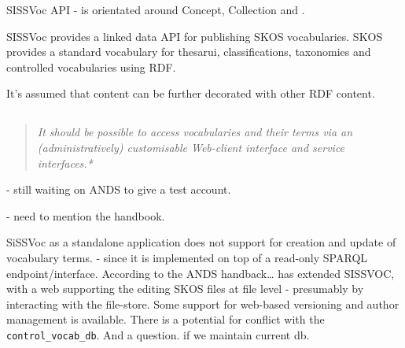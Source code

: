 \documentclass[10pt,a4paper]{article}
\newenvironment{italicquotes}
{\begin{quote}\itshape}
{\end{quote}}
\begin{document}
\begin{flushleft}
  SISSVoc API - is orientated around Concept, Collection and .


  SISSVoc provides a linked data API for publishing SKOS vocabularies.
  SKOS provides a standard vocabulary for thesarui, classifications, taxonomies
  and controlled vocabularies using RDF.

  It's assumed that content can be further decorated with other RDF content.



% 
% 
% 

  \subsection{} 
  \begin{italicquotes} 
  It should be possible to access vocabularies and their terms via an 
  (administratively) customisable Web-client interface and service interfaces.*

  \end{italicquotes} 

  - still waiting on ANDS to give a test account.

  - need to mention the handbook.

  SiSSVoc as a standalone application does not support for creation and update
  of vocabulary terms.  - since it is implemented on top of a read-only SPARQL
  endpoint/interface.  According to the ANDS handback… has extended SISSVOC, with
  a web supporting the editing SKOS files at file level - presumably by
  interacting with the file-store. Some support for web-based versioning and
  author management is available. There is a potential for conflict with the
  \texttt{control\_vocab\_db}. And a question. if we maintain current db.


\end{flushleft}
\end{document}
